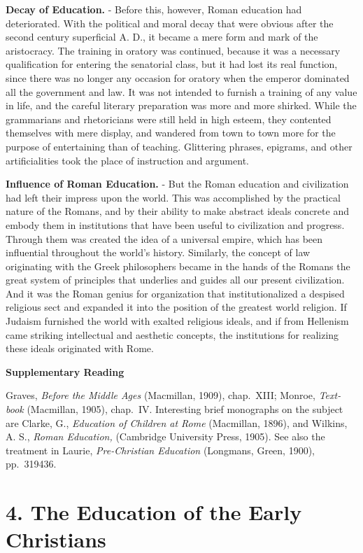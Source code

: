 \documentclass[
]{book}
\begin{document}
\textbf{Decay of Education.} - Before this, however, Roman education had deteriorated. With the political and moral decay that were obvious after the second century superficial A. D., it became a mere form and mark of the aristocracy. The training in oratory was continued, because it was a necessary qualification for entering the senatorial class, but it had lost its real function, since there was no longer any occasion for oratory when the emperor dominated all the government and law. It was not intended to furnish a training of any value in life, and the careful literary preparation was more and more shirked. While the grammarians and rhetoricians were still held in high esteem, they contented themselves with mere display, and wandered from town to town more for the purpose of entertaining than of teaching. Glittering phrases, epigrams, and other artificialities took the place of instruction and argument.

\textbf{Influence of Roman Education.} - But the Roman education and civilization had left their impress upon the world. This was accomplished by the practical nature of the Romans, and by their ability to make abstract ideals concrete and embody them in institutions that have been useful to civilization and progress. Through them was created the idea of a universal empire, which has been influential throughout the world's history. Similarly, the concept of law originating with the Greek philosophers became in the hands of the Romans the great system of principles that underlies and guides all our present civilization. And it was the Roman genius for organization that institutionalized a despised religious sect and expanded it into the position of the greatest world religion. If Judaism furnished the world with exalted religious ideals, and if from Hellenism came striking intellectual and aesthetic concepts, the institutions for realizing these ideals originated with Rome.

\textbf{Supplementary Reading}

Graves, \emph{Before the Middle Ages} (Macmillan, 1909), chap.~XIII; Monroe, \emph{Text-book} (Macmillan, 1905), chap.~IV. Interesting brief monographs on the subject are Clarke, G., \emph{Education of Children at Rome} (Macmillan, 1896), and Wilkins, A. S., \emph{Roman Education,} (Cambridge University Press, 1905). See also the treatment in Laurie, \emph{Pre-Christian Education} (Longmans, Green, 1900), pp.~319436.

\hypertarget{the-education-of-the-early-christians}{%
\chapter{4. The Education of the Early Christians}\label{the-education-of-the-early-christians}}
\end{document}
